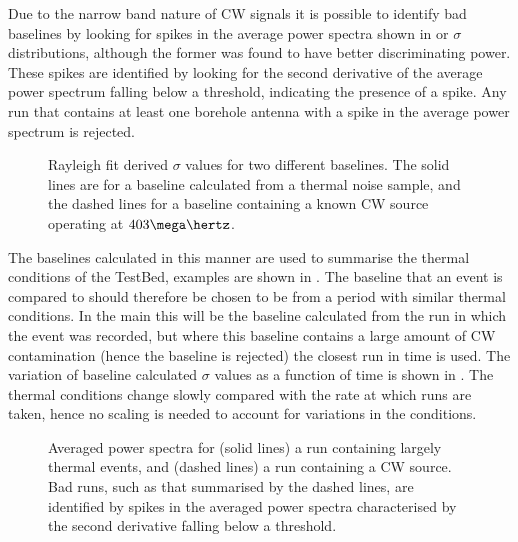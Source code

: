 Due to the narrow band nature of CW signals it is possible to identify bad baselines by looking for spikes in the average power spectra shown in  or $\sigma$ distributions, although the former was found to have better discriminating power. These spikes are identified by looking for the second derivative of the average power spectrum falling below a threshold, indicating the presence of a spike. Any run that contains at least one borehole antenna with a spike in the average power spectrum is rejected. 

\begin{figure}[htpb]
  \hfill
  \caption{Rayleigh fit derived $\sigma$ values for two different baselines. The solid lines are for a baseline calculated from a thermal noise sample, and the dashed lines for a baseline containing a known CW source operating at $403 \mega \hertz$.} 
  \label{fig:analysis:CWRemoval:Baselines:Rayleigh-Sigma}
\end{figure}

The baselines calculated in this manner are used to summarise the thermal conditions of the TestBed, examples are shown in . The baseline that an event is compared to should therefore be chosen to be from a period with similar thermal conditions. In the main this will be the baseline calculated from the run in which the event was recorded, but where this baseline contains a large amount of CW contamination (hence the baseline is rejected) the closest run in time is used. The variation of baseline calculated $\sigma$ values as a function of time is shown in . The thermal conditions change slowly compared with the rate at which runs are taken, hence no scaling is needed to account for variations in the conditions. 

\begin{figure}[htpb]
  \hfill
  \caption{Averaged power spectra for (solid lines) a run containing largely thermal events, and (dashed lines) a run containing a CW source. Bad runs, such as that summarised by the dashed lines, are identified by spikes in the averaged power spectra characterised by the second derivative falling below a threshold.}
  \label{fig:analysis:CWRemoval:Baselines:Averaged-Power}
\end{figure}

